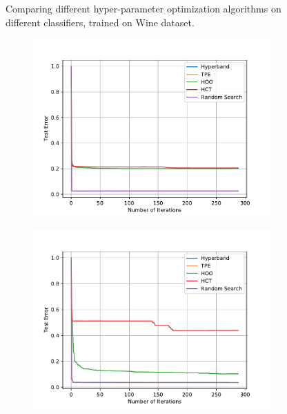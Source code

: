 \documentclass[twoside,11pt]{article}
\begin{document}
\begin{figure}
\begin{subfigure}[t]{0.3\textwidth}
    \caption{\SVM}
  \end{subfigure}
  \caption{Comparing different hyper-parameter optimization algorithms on different classifiers, trained on Wine dataset.}
  \label{fig:wine}
\end{figure}

\begin{figure}
  \centering
  \begin{subfigure}[t]{0.3\textwidth}
    \centering\includegraphics[width=\textwidth]{img/uci/ada_1.pdf}
    \caption{\Ada}
  \end{subfigure}
  \begin{subfigure}[t]{0.3\textwidth}
    \centering\includegraphics[width=\textwidth]{img/uci/gbm_1.pdf}

\end{subfigure}
\end{figure}
\end{document}
